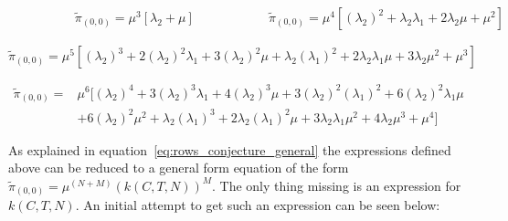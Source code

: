 \begin{multicols}{2}
    \begin{figure}[H]
        \centering
        \scalebox{0.8}{
            }
    \end{figure}
    \columnbreak
    \begin{figure}[H]
        \centering
        \scalebox{0.7}{
            }
    \end{figure}
\end{multicols}
\vspace{-0.5cm}
\begin{alignat}{2} \label{eq:00_rate_1131}
    \hspace{4em} & \tilde{\pi}_{(0,0)} = \mu^3[\lambda_2 + \mu] \hspace{5em} &
    \tilde{\pi}_{(0,0)} = \mu^4[(\lambda_2)^2 + \lambda_2 \lambda_1 + 2\lambda_2
    \mu + \mu^2]
\end{alignat}


\begin{figure}[H]
    \centering
    \scalebox{0.8}{
        }
\end{figure}
\begin{equation}\label{eq:00_rate_1141}
    \tilde{\pi}_{(0,0)} = \mu^5[(\lambda_2)^3 + 2(\lambda_2)^2 \lambda_1 +
    3(\lambda_2)^2 \mu + \lambda_2 (\lambda_1)^2 + 2\lambda_2 \lambda_1 \mu +
    3\lambda_2 \mu^2 + \mu^3]
\end{equation}

\begin{figure}[H]
    \centering
    \scalebox{0.8}{
        }
\end{figure}
\begin{align}\label{eq:00_rate_1151}
    \tilde{\pi}_{(0,0)} =& \mu^6[(\lambda_2)^4 + 3(\lambda_2)^3 \lambda_1 +
    4(\lambda_2)^3 \mu + 3(\lambda_2)^2 (\lambda_1)^2 +
    6(\lambda_2)^2 \lambda_1 \mu \\
    & + 6(\lambda_2)^2 \mu^2 + \lambda_2 (\lambda_1)^3 +
    2\lambda_2 (\lambda_1)^2 \mu + 3\lambda_2 \lambda_1 \mu^2 +
    4\lambda_2 \mu^3 + \mu^4] \nonumber
\end{align}


As explained in equation~\eqref{eq:rows_conjecture_general} the expressions
defined above can be reduced to a general form equation of the form
\(\tilde{\pi}_{(0,0)} = \mu^{(N+M)} (k(C,T,N))^M\).
The only thing missing is an expression for \(k(C,T,N)\).
An initial attempt to get such an expression can be seen below:

